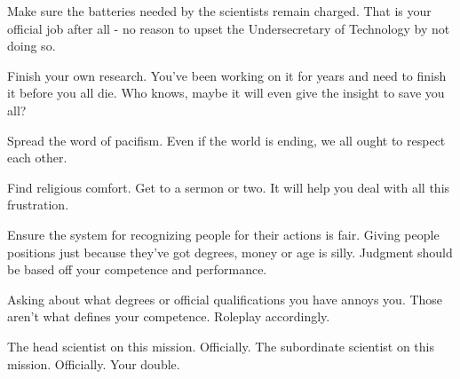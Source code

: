 \documentclass[char]{guildcamp3}
\begin{document}
\begin{itemz}[Goals]
  \item Make sure the batteries needed by the scientists remain charged. That is your official job after all - no reason to upset the Undersecretary of Technology by not doing so. 
  \item Finish your own research. You've been working on it for years and need to finish it before you all die. Who knows, maybe it will even give the insight to save you all?
  \item Spread the word of pacifism. Even if the world is ending, we all ought to respect each other.
  \item Find religious comfort. Get to a sermon or two. It will help you deal with all this frustration.
  \item Ensure the system for recognizing people for their actions is fair. Giving people positions just because they've got degrees, money or age is silly. Judgment should be based off your competence and performance. 
\end{itemz}

\begin{itemz}[Notes]
  \item Asking about what degrees or official qualifications you have annoys you. Those aren't what defines your competence. Roleplay accordingly.  
\end{itemz}


\begin{contacts}
  \contact{\cSciOne{}} The head scientist on this mission. Officially. 
  \contact{\cSciTwo{}} The subordinate scientist on this mission. Officially. 
  \contact{\cServant{}} Your double. 
\end{contacts}
\end{document}
